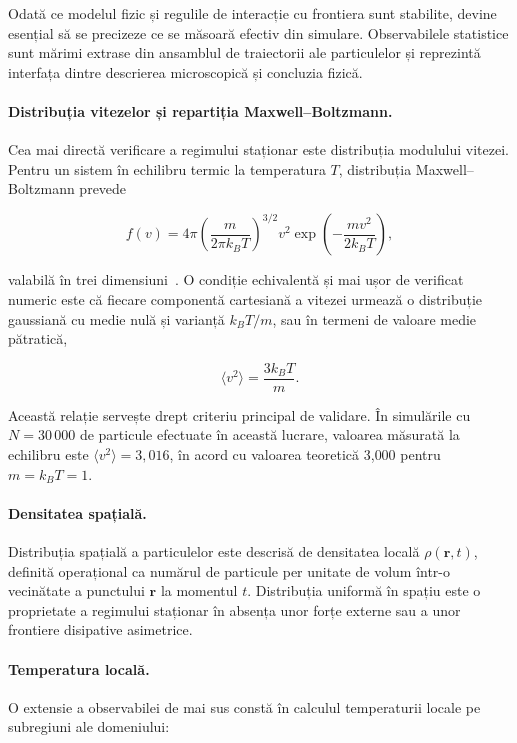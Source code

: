 \documentclass[12pt,openright,twoside]{book}
\begin{document}
Odată ce modelul fizic și regulile de interacție cu frontiera sunt stabilite, devine esențial să se precizeze ce se măsoară efectiv din simulare. Observabilele statistice sunt mărimi extrase din ansamblul de traiectorii ale particulelor și reprezintă interfața dintre descrierea microscopică și concluzia fizică.

\paragraph{Distribuția vitezelor și repartiția Maxwell--Boltzmann.}
Cea mai directă verificare a regimului staționar este distribuția modulului vitezei. Pentru un sistem în echilibru termic la temperatura $T$, distribuția Maxwell--Boltzmann prevede

\begin{equation}
    f(v) = 4\pi \left(\frac{m}{2\pi k_B T}\right)^{3/2} v^2 \exp\!\left(-\frac{mv^2}{2k_B T}\right),
    \label{eq:maxwell_boltzmann}
\end{equation}

valabilă în trei dimensiuni~\cite{reif2009,pathria2011,mandl2008}. O condiție echivalentă și mai ușor de verificat numeric este că fiecare componentă cartesiană a vitezei urmează o distribuție gaussiană cu medie nulă și varianță $k_B T / m$, sau în termeni de valoare medie pătratică,

\begin{equation}
    \langle v^2 \rangle = \frac{3k_B T}{m}.
    \label{eq:equipartitie}
\end{equation}

Această relație servește drept criteriu principal de validare. În simulările cu $N=30\,000$ de particule efectuate în această lucrare, valoarea măsurată la echilibru este $\langle v^2 \rangle = 3{,}016$, în acord cu valoarea teoretică 3{,}000 pentru $m=k_B T=1$.

\paragraph{Densitatea spațială.}
Distribuția spațială a particulelor este descrisă de densitatea locală $\rho(\mathbf{r},t)$, definită operațional ca numărul de particule per unitate de volum într-o vecinătate a punctului $\mathbf{r}$ la momentul $t$. Distribuția uniformă în spațiu este o proprietate a regimului staționar în absența unor forțe externe sau a unor frontiere disipative asimetrice.

\paragraph{Temperatura locală.}
O extensie a observabilei de mai sus constă în calculul temperaturii locale pe subregiuni ale domeniului:
\end{document}
